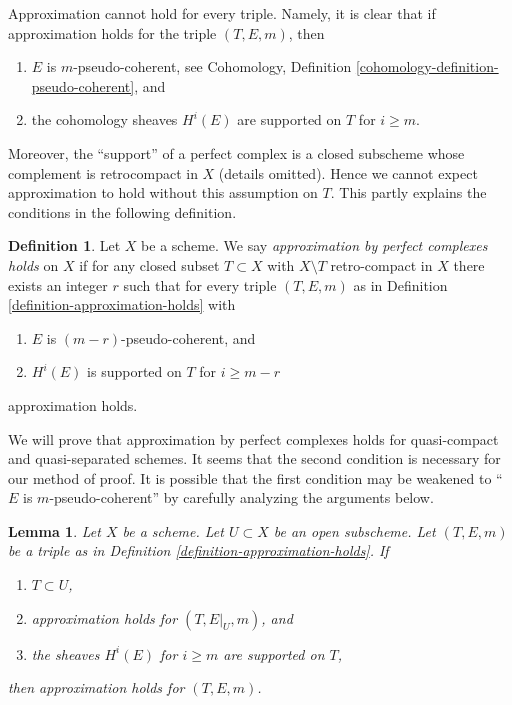 \documentclass{stacks-project}
\theoremstyle{plain}
\newtheorem{lemma}[subsection]{Lemma}
\theoremstyle{definition}
\newtheorem{definition}[subsection]{Definition}
\theoremstyle{remark}
\numberwithin{equation}{subsection}
\begin{document}
\noindent
Approximation cannot hold for every triple. Namely, it is clear that if
approximation holds for the triple $(T, E, m)$, then
\begin{enumerate}
\item $E$ is $m$-pseudo-coherent, see
Cohomology, Definition \ref{cohomology-definition-pseudo-coherent}, and
\item the cohomology sheaves $H^i(E)$ are supported on $T$ for $i \geq m$.
\end{enumerate}
Moreover, the ``support'' of a perfect complex is a closed subscheme
whose complement is retrocompact in $X$ (details omitted). Hence we cannot
expect approximation to hold without this assumption on $T$.
This partly explains the conditions in the following definition.

\begin{definition}
\label{definition-approximation}
Let $X$ be a scheme. We say {\it approximation by perfect complexes holds}
on $X$ if for any closed subset $T \subset X$ with $X \setminus T$
retro-compact in $X$ there exists an integer $r$ such that
for every triple $(T, E, m)$ as in
Definition \ref{definition-approximation-holds} with
\begin{enumerate}
\item $E$ is $(m - r)$-pseudo-coherent, and
\item $H^i(E)$ is supported on $T$ for $i \geq m - r$
\end{enumerate}
approximation holds.
\end{definition}

\noindent
We will prove that approximation by perfect complexes holds for
quasi-compact and quasi-separated schemes. It seems that the second
condition is necessary for our method of proof. It is possible that the
first condition may be weakened to ``$E$ is $m$-pseudo-coherent''
by carefully analyzing the arguments below.

\begin{lemma}
\label{lemma-open}
Let $X$ be a scheme. Let $U \subset X$ be an open subscheme.
Let $(T, E, m)$ be a triple as in
Definition \ref{definition-approximation-holds}.
If
\begin{enumerate}
\item $T \subset U$,
\item approximation holds for $(T, E|_U, m)$, and
\item the sheaves $H^i(E)$ for $i \geq m$ are supported on $T$,
\end{enumerate}
then approximation holds for $(T, E, m)$.
\end{lemma}
\end{document}
